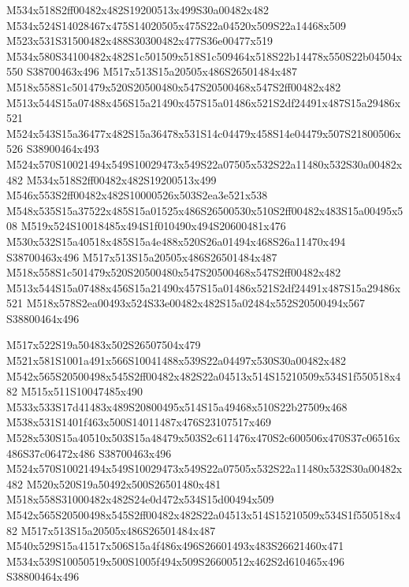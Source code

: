 \documentclass{article}
\begin{document}
\begin{multicols}{2}
M534x518S2ff00482x482S19200513x499S30a00482x482 M534x524S14028467x475S14020505x475S22a04520x509S22a14468x509 M523x531S31500482x488S30300482x477S36e00477x519 M534x580S34100482x482S1c501509x518S1c509464x518S22b14478x550S22b04504x550 S38700463x496 M517x513S15a20505x486S26501484x487 M518x558S1c501479x520S20500480x547S20500468x547S2ff00482x482 M513x544S15a07488x456S15a21490x457S15a01486x521S2df24491x487S15a29486x521 M524x543S15a36477x482S15a36478x531S14c04479x458S14e04479x507S21800506x526 S38900464x493 M524x570S10021494x549S10029473x549S22a07505x532S22a11480x532S30a00482x482 M534x518S2ff00482x482S19200513x499 M546x553S2ff00482x482S10000526x503S2ea3e521x538 M548x535S15a37522x485S15a01525x486S26500530x510S2ff00482x483S15a00495x508 M519x524S10018485x494S1f010490x494S20600481x476 M530x532S15a40518x485S15a4e488x520S26a01494x468S26a11470x494 S38700463x496 M517x513S15a20505x486S26501484x487 M518x558S1c501479x520S20500480x547S20500468x547S2ff00482x482 M513x544S15a07488x456S15a21490x457S15a01486x521S2df24491x487S15a29486x521 M518x578S2ea00493x524S33e00482x482S15a02484x552S20500494x567 S38800464x496

M517x522S19a50483x502S26507504x479 M521x581S1001a491x566S10041488x539S22a04497x530S30a00482x482 M542x565S20500498x545S2ff00482x482S22a04513x514S15210509x534S1f550518x482 M515x511S10047485x490 M533x533S17d41483x489S20800495x514S15a49468x510S22b27509x468 M538x531S1401f463x500S14011487x476S23107517x469 M528x530S15a40510x503S15a48479x503S2c611476x470S2c600506x470S37c06516x486S37c06472x486 S38700463x496 M524x570S10021494x549S10029473x549S22a07505x532S22a11480x532S30a00482x482 M520x520S19a50492x500S26501480x481 M518x558S31000482x482S24e0d472x534S15d00494x509 M542x565S20500498x545S2ff00482x482S22a04513x514S15210509x534S1f550518x482 M517x513S15a20505x486S26501484x487 M540x529S15a41517x506S15a4f486x496S26601493x483S26621460x471 M534x539S10050519x500S1005f494x509S26600512x462S2d610465x496 S38800464x496


\end{multicols}
\end{document}
